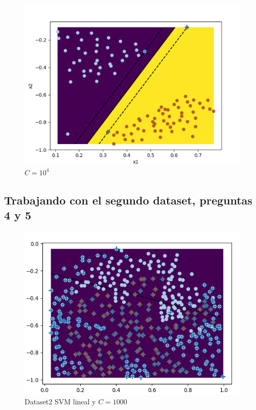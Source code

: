 \begin{figure}
	\centering
    \includegraphics[scale=0.8]{img/10_4}	
    \caption{$C = 10^{4}$}
	\label{fig:var2}
\end{figure}

\subsection{Trabajando con el segundo dataset, preguntas 4 y 5}

\begin{figure}[H]
	\centering
	\includegraphics[scale=1]{img/dataset2_1}
    \caption{Dataset2 SVM lineal y $C=1000$}
    \label{dataset2}
\end{figure}

